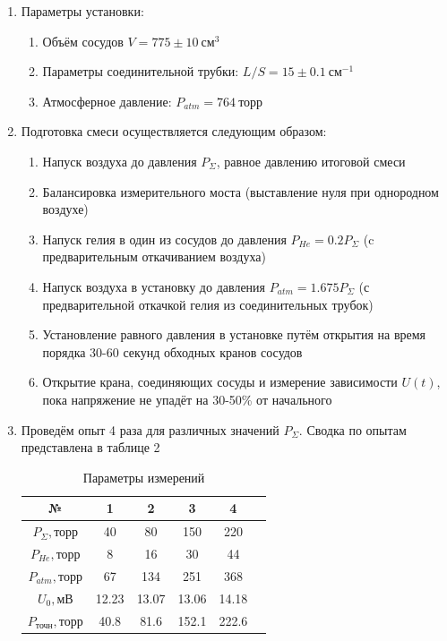 \documentclass[a4paper,12pt]{article}
\begin{document}
\begin{enumerate}
\item Параметры установки:
    \begin{enumerate}
        \item Объём сосудов $V = 775 \pm 10 \ \text{см}^3$
        \item Параметры соединительной трубки: $L/S = 15 \pm 0.1 \ \text{см}^{-1}$
        \item Атмосферное давление: $P_{atm} = 764 \ \text{торр}$
    \end{enumerate}
\item Подготовка смеси осуществляется следующим образом:
    \begin{enumerate}
        \item Напуск воздуха до давления $P_\Sigma$, равное давлению итоговой смеси
        \item Балансировка измерительного моста (выставление нуля при однородном воздухе)
        \item Напуск гелия в один из сосудов до давления $P_{He} = 0.2 P_\Sigma$ (c предварительным откачиванием воздуха)
        \item Напуск воздуха в установку до давления $P_{atm} = 1.675 P_\Sigma $ (с предварительной откачкой гелия из соединительных трубок)
        \item Установление равного давления в установке путём открытия на время порядка 30-60 секунд обходных кранов сосудов
        \item Открытие крана, соединяющих сосуды и измерение зависимости $U(t)$, пока напряжение не упадёт на 30-50\% от начального

    \end{enumerate}
\item Проведём опыт 4 раза для различных значений $P_\Sigma$. Сводка по опытам представлена в таблице 2

\begin{center}
 \begin{table}[h!]
    \centering
    \caption{Параметры измерений}
    \begin{tabular}{|c|c|c|c|c|c|}
    \hline
    № & 1 & 2 & 3 & 4 \\ \hline
    $P_\Sigma, \text{торр}$ & 40 & 80 & 150 & 220 \\ \hline
    $P_{He}, \text{торр}$   & 8  & 16 & 30  & 44  \\ \hline
    $P_{atm},\text{торр}$   & 67 & 134 & 251 & 368 \\ \hline
    $U_0, \text{мВ}     $   & 12.23 & 13.07 & 13.06 & 14.18 \\ \hline
    $P_{\text{точн}}, \text{торр}$ & 40.8 & 81.6 & 152.1 & 222.6  \\ \hline
    \end{tabular}
    \end{table}
\end{center}


\end{enumerate}
\end{document}
